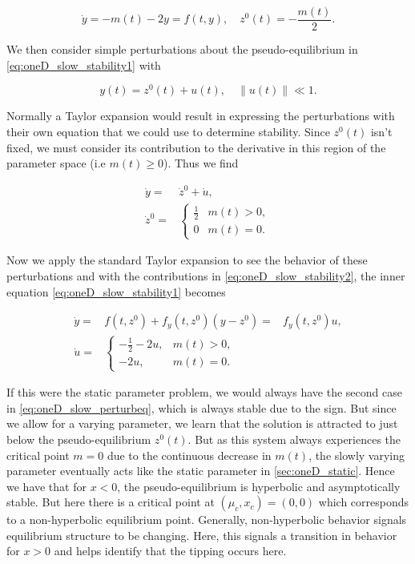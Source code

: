 \begin{equation}\label{eq:oneD_slow_stability1}
\dot{y}=-m(t)-2y=f(t,y), \quad z^0(t)=-\frac{m(t)}{2}.
\end{equation}

We then consider simple perturbations about the pseudo-equilibrium in \eqref{eq:oneD_slow_stability1} with

\begin{equation*}
y(t)=z^0(t)+u(t), \quad \lVert u(t) \rVert \ll 1.
\end{equation*}

Normally a Taylor expansion would result in expressing the perturbations with their own equation that we could use to determine stability. Since $z^0(t)$ isn't fixed, we must consider its contribution to the derivative in this region of the parameter space (i.e $m(t)\ge 0$). Thus we find

\begin{equation}\label{eq:oneD_slow_stability2}
\begin{aligned}
\dot{y} =& \dot{z}^0+\dot{u},\\
\dot{z}^0= & \begin{cases}
\frac{1}{2} & m(t)>0,\\
0 & m(t)=0.
\end{cases}
\end{aligned}
\end{equation}

Now we apply the standard Taylor expansion to see the behavior of these perturbations and with the contributions in \eqref{eq:oneD_slow_stability2}, the inner equation \eqref{eq:oneD_slow_stability1} becomes

\begin{equation}\label{eq:oneD_slow_perturbeq}
\begin{aligned}
\dot{y}=& f(t,z^0)+f_y(t,z^0)(y-z^0)
=& f_y(t,z^0)u,\\
\dot{u}=&\begin{cases}
-\frac{1}{2}-2u, & m(t)>0,\\
-2u, & m(t)=0.
\end{cases}
\end{aligned}
\end{equation}

If this were the static parameter problem, we would always have the second case in \eqref{eq:oneD_slow_perturbeq}, which is always stable due to the sign. But since we allow for a varying parameter, we learn that the solution is attracted to just below the pseudo-equilibrium $z^0(t)$. But as this system always experiences the critical point $m=0$ due to the continuous decrease in $m(t)$, the slowly varying parameter eventually acts like the static parameter in \autoref{sec:oneD_static}. Hence we have that for $x<0$, the pseudo-equilibrium is hyperbolic and asymptotically stable. But here there is a critical point at $(\mu_c,x_c)=(0,0)$ which corresponds to a non-hyperbolic equilibrium point. Generally, non-hyperbolic behavior signals equilibrium structure to be changing. Here, this signals a transition in behavior for $x>0$ and helps identify that the tipping occurs here.

